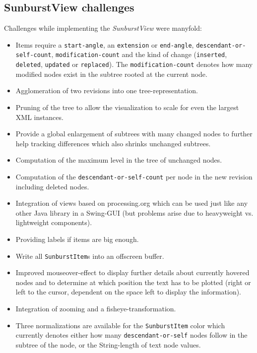 \documentclass{llncs}
\begin{document}
\subsection{SunburstView challenges}
Challenges while implementing the \emph{SunburstView} were manyfold:

\begin{itemize}
\item Items require a \texttt{start-angle}, an \texttt{extension} or \texttt{end-angle}, \texttt{descendant-or-\\self-count}, \texttt{modification-count} and the kind of change (\texttt{inserted}, \texttt{deleted}, \texttt{updated} or \texttt{replaced}). The \texttt{modification-count} denotes how many modified nodes exist in the subtree rooted at the current node.
\item Agglomeration of two revisions into one tree-representation.
\item Pruning of the tree to allow the visualization to scale for even the largest XML instances.
\item Provide a global enlargement of subtrees with many changed nodes to further help tracking differences which also shrinks unchanged subtrees.
\item Computation of the maximum level in the tree of unchanged nodes.
\item Computation of the \texttt{descendant-or-self-count} per node in the new revision including deleted nodes.
\item Integration of views based on processing.org\cite{processing.org} which can be used just like any other Java library in a Swing-GUI (but problems arise due to heavyweight vs. lightweight components).
\item Providing labels if items are big enough.
\item Write all \texttt{SunburstItem}s into an offscreen buffer.
\item Improved mouseover-effect to display further details about currently hovered nodes and to determine at which position the text has to be plotted (right or left to the cursor, dependent on the space left to display the information).
\item Integration of zooming and a fisheye-transformation.
\item Three normalizations are available for the \texttt{SunburstItem} color which currently denotes either how many \texttt{descendant-or-self} nodes follow in the subtree of the node, or the String-length of text node values.
\end{itemize}
\end{document}
